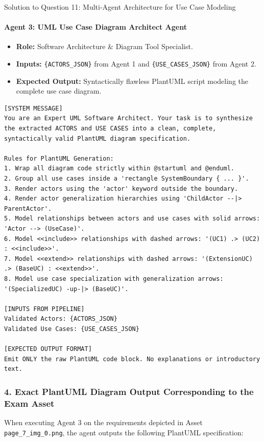 \documentclass[11pt,a4paper]{article}
\begin{document}
\begin{solutionbox}{Solution to Question 11: Multi-Agent Architecture for Use Case Modeling}
\paragraph{Agent 3: UML Use Case Diagram Architect Agent}
\begin{itemize}[itemsep=1pt]
    \item \textbf{Role:} Software Architecture \& Diagram Tool Specialist.
    \item \textbf{Inputs:} \texttt{\{ACTORS\_JSON\}} from Agent 1 and \texttt{\{USE\_CASES\_JSON\}} from Agent 2.
    \item \textbf{Expected Output:} Syntactically flawless PlantUML script modeling the complete use case diagram.
\end{itemize}

\begin{lstlisting}[style=mydiff,caption={Full Prompt Specification for Agent 3 (UML Diagram Architect)}]
[SYSTEM MESSAGE]
You are an Expert UML Software Architect. Your task is to synthesize the extracted ACTORS and USE CASES into a clean, complete, syntactically valid PlantUML diagram specification.

Rules for PlantUML Generation:
1. Wrap all diagram code strictly within @startuml and @enduml.
2. Group all use cases inside a 'rectangle SystemBoundary { ... }'.
3. Render actors using the 'actor' keyword outside the boundary.
4. Render actor generalization hierarchies using 'ChildActor --|> ParentActor'.
5. Model relationships between actors and use cases with solid arrows: 'Actor --> (UseCase)'.
6. Model <<include>> relationships with dashed arrows: '(UC1) .> (UC2) : <<include>>'.
7. Model <<extend>> relationships with dashed arrows: '(ExtensionUC) .> (BaseUC) : <<extend>>'.
8. Model use case specialization with generalization arrows: '(SpecializedUC) -up-|> (BaseUC)'.

[INPUTS FROM PIPELINE]
Validated Actors: {ACTORS_JSON}
Validated Use Cases: {USE_CASES_JSON}

[EXPECTED OUTPUT FORMAT]
Emit ONLY the raw PlantUML code block. No explanations or introductory text.
\end{lstlisting}

\subsubsection*{4. Exact PlantUML Diagram Output Corresponding to the Exam Asset}
When executing Agent 3 on the requirements depicted in Asset \texttt{page\_7\_img\_0.png}, the agent outputs the following PlantUML specification:


\end{solutionbox}
\end{document}
